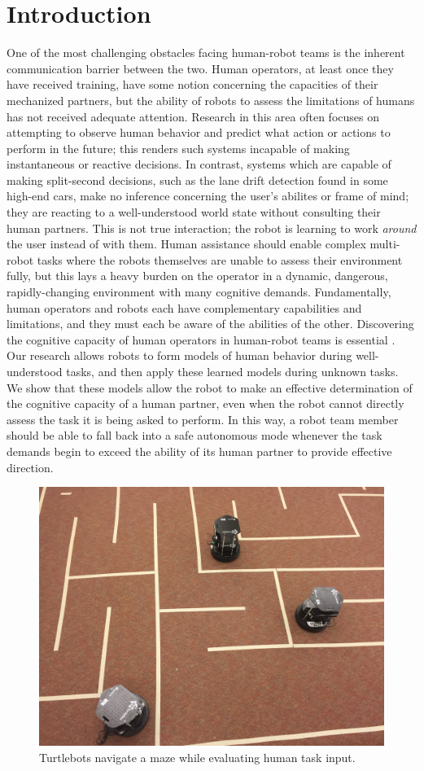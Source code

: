 \documentclass{sig-alternate}
\begin{document}
\section{Introduction}
One of the most challenging obstacles facing human-robot teams is the
inherent communication barrier between the two. Human operators, at
least once they have received training, have some notion concerning
the capacities of their mechanized partners, but the ability of robots
to assess the limitations of humans has not received adequate
attention. Research in this area often focuses on attempting to
observe human behavior and predict what action or actions to perform
in the future; this renders such systems incapable of making
instantaneous or reactive decisions. In contrast, systems which are
capable of making split-second decisions, such as the lane drift
detection found in some high-end cars, make no inference concerning
the user's abilites or frame of mind; they are reacting to a
well-understood world state without consulting their human
partners. This is not true interaction; the robot is learning to work
\textit{around} the user instead of with them.  Human assistance
should enable complex multi-robot tasks where the robots themselves
are unable to assess their environment fully, but this lays a heavy
burden on the operator in a dynamic, dangerous, rapidly-changing
environment with many cognitive demands.  Fundamentally, human
operators and robots each have complementary capabilities and
limitations, and they must each be aware of the abilities of the
other.  Discovering the cognitive capacity of human operators in
human-robot teams is essential \cite{Malchus:2013:REC:2447556.2447632}.
Our research allows robots to form models of human behavior during
well-understood tasks, and then apply these learned models during
unknown tasks.  We show that these models allow the robot to make an
effective determination of the cognitive capacity of a human partner,
even when the robot cannot directly assess the task it is being asked
to perform.  In this way, a robot team member should be able to fall
back into a safe autonomous mode whenever the task demands begin to
exceed the ability of its human partner to provide effective
direction.

\begin{figure}
\centering
\includegraphics[width=.5\textwidth]{robots-in-maze.jpg}
\caption{Turtlebots navigate a maze while evaluating human task input.}
\label{fig:game_photo}
\end{figure}
\end{document}
